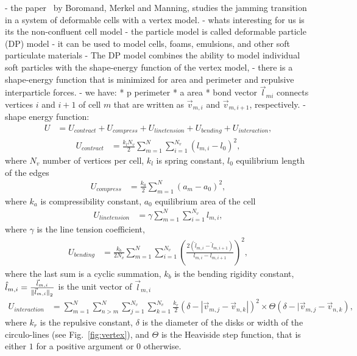 - the paper~\cite{Boromand2018} by Boromand, Merkel and Manning, studies the jamming transition in a system of deformable cells with a vertex model. 
- whats interesting for us is its the non-confluent cell model 
- the particle model is called deformable particle (DP) model
- it can be used to model cells, foams, emulsions, and other soft particulate materials
- The DP model combines the ability to model individual soft particles with the shape-energy function of the vertex model,
- there is a shape-energy function that is minimized for area and perimeter and repulsive interparticle forces. 
- we have:
* p perimeter 
* a area 
* bond vector $\vec{l}_{mi}$ connects vertices $i$ and $i+1$ of cell $m$ that are written as $\vec{v}_{m,i}$ and $\vec{v}_{m,i+1}$, respectively.
- shape energy function:
\begin{align*}
	U &= U_{contract} + U_{compress} + U_{line tension} + U_{bending} + U_{interaction} ,
\end{align*}
\begin{align*}
	U_{contract} &= \frac{k_l N_v}{2} \sum\limits_{m=1}^{N} \sum\limits_{i=1}^{N_v} (l_{m,i}-l_0)^2,
\end{align*}
where $N_v$ number of vertices per cell, $k_l$ is spring constant, $l_0$ equilibrium length of the edges 
\begin{align*}
	U_{compress} &= \frac{k_a}{2} \sum\limits_{m=1}^{N} (a_m - a_0)^2, 
\end{align*}
where $k_a$ is compressibility constant, $a_0$ equilibrium area of the cell
\begin{align*}
	U_{line tension} &= \gamma \sum\limits_{m=1}^{N} \sum\limits_{i=1}^{N_v} l_{m,i} ,
\end{align*}
where $\gamma$ is the line tension coefficient, 
\begin{align*}
	U_{bending} &= \frac{k_b}{2 N_v} \sum\limits_{m=1}^{N} \sum\limits_{i=1}^{N_v} \left( \frac{2( \hat{l}_{m,i} - \hat{l}_{m,i+1})}{l_{m,i} - l_{m,i+1}}  \right)^2 ,
\end{align*}
where the last sum is a cyclic summation, $k_b$ is the bending rigidity constant, $\hat{l}_{m,i} = \frac{\vec{l}_{m,i}}{\norm[\vec{l}_{m,i}]} $ is the unit vector of $\vec{l}_{m,i}$
\begin{align*}
	U_{interaction} &=  \sum\limits_{m=1}^{N} \sum\limits_{n>m}^{N} \sum\limits_{j=1}^{N_v} \sum\limits_{k=1}^{N_v} \frac{k_r}{2} (\delta - |\vec{v}_{m,j} - \vec{v}_{n,k} |)^2 \times \Theta(\delta - |\vec{v}_{m,j} - \vec{v}_{n,k}) ,
\end{align*}
where $k_r$ is the repulsive constant, $\delta$ is the diameter of the disks or width of the circulo-lines (see Fig.~\ref{fig:vertex}), and $\Theta$ is the Heaviside step function, that is either $1$ for a positive argument or $0$ otherwise. \\

